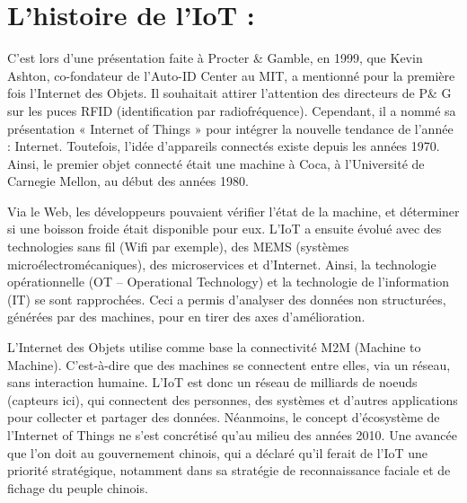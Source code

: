 \section{L’histoire de l’IoT :}
C’est lors d’une présentation faite à Procter \& Gamble, en 1999, que Kevin Ashton, co-fondateur de l’Auto-ID Center au MIT, a mentionné pour la première fois l’Internet des Objets. Il souhaitait attirer l’attention des directeurs de P\& G sur les puces RFID (identification par radiofréquence). Cependant, il a nommé sa présentation « Internet of Things » pour intégrer la nouvelle tendance de l’année : Internet. Toutefois, l’idée d’appareils connectés existe depuis les années 1970. Ainsi, le premier objet connecté était une machine à Coca, à l’Université de Carnegie Mellon, au début des années 1980.

Via le Web, les développeurs pouvaient vérifier l’état de la machine, et déterminer si une boisson froide était disponible pour eux. L’IoT a ensuite évolué avec des technologies sans fil (Wifi par exemple), des MEMS (systèmes microélectromécaniques), des microservices et d’Internet. Ainsi, la technologie opérationnelle (OT – Operational Technology) et la technologie de l’information (IT) se sont rapprochées. Ceci a permis d’analyser des données non structurées, générées par des machines, pour en tirer des axes d’amélioration.

L’Internet des Objets utilise comme base la connectivité M2M (Machine to Machine). C’est-à-dire que des machines se connectent entre elles, via un réseau, sans interaction humaine. L’IoT est donc un réseau de milliards de noeuds (capteurs ici), qui connectent des personnes, des systèmes et d’autres applications pour collecter et partager des données. Néanmoins, le concept d’écosystème de l’Internet of Things ne s’est concrétisé qu’au milieu des années 2010. Une avancée que l’on doit au gouvernement chinois, qui a déclaré qu’il ferait de l’IoT une priorité stratégique, notamment dans sa stratégie de reconnaissance faciale et de fichage du peuple chinois.
